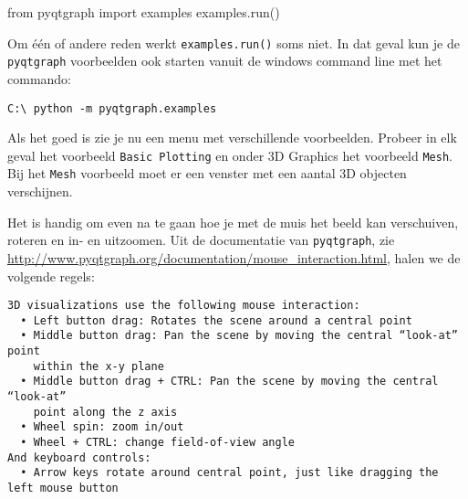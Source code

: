 \documentclass[a4paper,11pt]{article}
\begin{document}
\begin{pyconsole}
from pyqtgraph import examples
examples.run()

\end{pyconsole}
Om \'e\'en of andere reden werkt \texttt{examples.run()} soms niet. In dat
geval kun je de \texttt{pyqtgraph} voorbeelden ook starten vanuit de windows
command line met het commando:
\begin{verbatim}
C:\ python -m pyqtgraph.examples
\end{verbatim}
Als het goed is zie je nu een menu met verschillende voorbeelden. Probeer in elk geval het voorbeeld \texttt{Basic Plotting} en onder 3D Graphics het voorbeeld \texttt{Mesh}. Bij het \texttt{Mesh} voorbeeld moet er een venster met een aantal 3D objecten verschijnen.

Het is handig om even na te gaan hoe je met de muis het beeld kan verschuiven, roteren en in- en uitzoomen. Uit de documentatie van \texttt{pyqtgraph}, zie \url{http://www.pyqtgraph.org/documentation/mouse_interaction.html}, halen we de volgende regels: 
\begin{verbatim}
3D visualizations use the following mouse interaction:
  • Left button drag: Rotates the scene around a central point
  • Middle button drag: Pan the scene by moving the central “look-at” point
    within the x-y plane
  • Middle button drag + CTRL: Pan the scene by moving the central “look-at”
    point along the z axis
  • Wheel spin: zoom in/out
  • Wheel + CTRL: change field-of-view angle
And keyboard controls:
  • Arrow keys rotate around central point, just like dragging the left mouse button
\end{verbatim}
\end{document}

